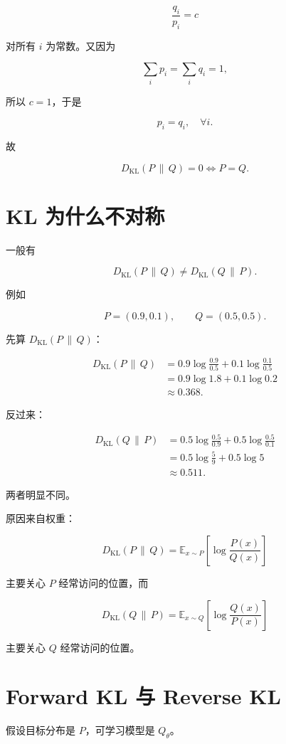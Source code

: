 \documentclass[11pt,a4paper]{ctexart}
\newcommand{\KL}[2]{D_{\mathrm{KL}}\!\left(#1\,\middle\|\,#2\right)}
\newcommand{\E}{\mathbb{E}}
\begin{document}
\[
\frac{q_i}{p_i}=c
\]

对所有 $i$ 为常数。又因为

\[
\sum_i p_i=\sum_i q_i=1,
\]

所以 $c=1$，于是

\[
p_i=q_i,\quad \forall i.
\]

故

\begin{equation}
\boxed{
\KL{P}{Q}=0
\iff
P=Q.
}
\end{equation}

\section{KL 为什么不对称}

一般有

\[
\KL{P}{Q}
\neq
\KL{Q}{P}.
\]

例如

\[
P=(0.9,0.1),
\qquad
Q=(0.5,0.5).
\]

先算 $\KL{P}{Q}$：

\begin{align}
\KL{P}{Q}
&=
0.9\log\frac{0.9}{0.5}
+
0.1\log\frac{0.1}{0.5}
\\
&=
0.9\log 1.8
+
0.1\log 0.2
\\
&\approx
0.368.
\end{align}

反过来：

\begin{align}
\KL{Q}{P}
&=
0.5\log\frac{0.5}{0.9}
+
0.5\log\frac{0.5}{0.1}
\\
&=
0.5\log\frac{5}{9}
+
0.5\log 5
\\
&\approx
0.511.
\end{align}

两者明显不同。

原因来自权重：

\[
\KL{P}{Q}
=
\E_{x\sim P}
\left[
\log\frac{P(x)}{Q(x)}
\right]
\]

主要关心 $P$ 经常访问的位置，而

\[
\KL{Q}{P}
=
\E_{x\sim Q}
\left[
\log\frac{Q(x)}{P(x)}
\right]
\]

主要关心 $Q$ 经常访问的位置。

\section{Forward KL 与 Reverse KL}

假设目标分布是 $P$，可学习模型是 $Q_\theta$。
\end{document}
